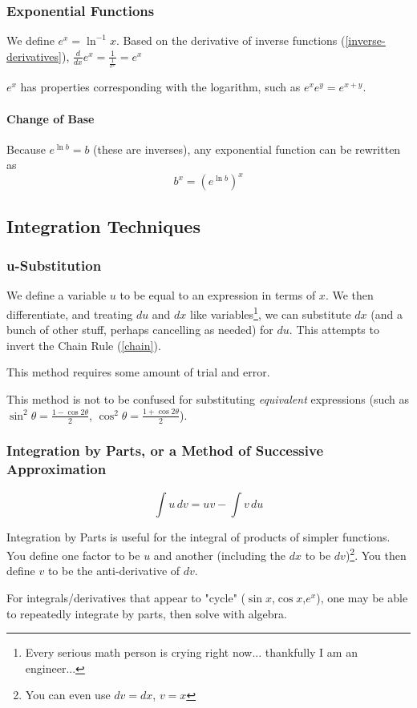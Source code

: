 \documentclass{article}
\begin{document}
\subsubsection{Exponential Functions}
We define $e^x=\ln^{-1}x$. Based on the derivative of inverse functions (\ref{inverse-derivatives}), $\frac{d}{dx}e^x=\frac{1}{\frac{1}{e^x}}=e^x$

$e^x$ has properties corresponding with the logarithm, such as $e^xe^y=e^{x+y}$.

\paragraph{Change of Base}
Because $e^{\ln{b}}=b$ (these are inverses), any exponential function can be rewritten as
$$b^x=\left(e^{\ln{b}}\right)^x$$

\subsection{Integration Techniques}
\subsubsection{u-Substitution}
We define a variable $u$ to be equal to an expression in terms of $x$. We then differentiate, and treating $du$ and $dx$ like variables\footnote{Every serious math person is crying right now... thankfully I am an engineer...}, we can substitute $dx$ (and a bunch of other stuff, perhaps cancelling as needed) for $du$.
This attempts to invert the Chain Rule (\ref{chain}).

This method requires some amount of trial and error.

This method is not to be confused for substituting \emph{equivalent} expressions (such as $\sin^2{\theta} = \frac{1-\cos{2\theta}}{2}$, $\cos^2{\theta} = \frac{1+\cos{2\theta}}{2}$).

\subsubsection{Integration by Parts, or a Method of Successive Approximation}
$$\int u\,dv=uv-\int v\,du$$

Integration by Parts is useful for the integral of products of simpler functions. You define one factor to be $u$ and another (including the $dx$ to be $dv$)\footnote{You can even use $dv=dx$, $v=x$}. You then define $v$ to be the anti-derivative of $dv$.

For integrals/derivatives that appear to "cycle" ($\sin{x}$,$\cos{x}$,$e^x$), one may be able to repeatedly integrate by parts, then solve with algebra.
\end{document}

